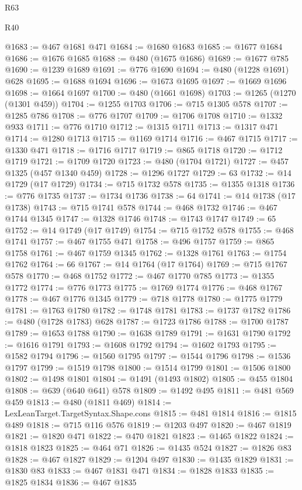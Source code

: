 \begin{lexlean}{R63}
\begin{lexlean}{R40}
\begin{coremodule}
{{{{{{{{{{{{{{{{{{{{{{{{{{{{{{{{{{{{{{{{{{{{{{{{{{{{{{{{{{{{{{{{{{{{{{{{{{{{{{{{{{{{{{{{{{{{{{{{{{{{{{{{{{{{{@1683 := @467 @1681 @471
@1684 := @1680 @1683
@1685 := @1677 @1684
@1686 := @1676 @1685
@1688 := @480 (@1675 @1686)
@1689 := @1677 @785
@1690 := @1239 @1689
@1691 := @776 @1690
@1694 := @480 (@1228 @1691) @628
@1695 := @1688 @1694
@1696 := @1673 @1695
@1697 := @1669 @1696
@1698 := @1664 @1697
@1700 := @480 (@1661 @1698)
@1703 := @1265 (@1270 (@1301 @459))
@1704 := @1255 @1703
@1706 := @715 @1305 @578
@1707 := @1285 @786
@1708 := @776 @1707
@1709 := @1706 @1708
@1710 := @1332 @933
@1711 := @776 @1710
@1712 := @1315 @1711
@1713 := @1317 @471
@1714 := @1280 @1713
@1715 := @1169 @1714
@1716 := @467 @1715
@1717 := @1330 @471
@1718 := @1716 @1717
@1719 := @865 @1718
@1720 := @1712 @1719
@1721 := @1709 @1720
@1723 := @480 (@1704 @1721)
@1727 := @457 @1325 (@457 @1340 @459)
@1728 := @1296 @1727
@1729 := 63
@1732 := @14 @1729 (@17 @1729)
@1734 := @715 @1732 @578
@1735 := @1355 @1318
@1736 := @776 @1735
@1737 := @1734 @1736
@1738 := 64
@1741 := @14 @1738 (@17 @1738)
@1743 := @715 @1741 @578
@1744 := @468 @1732
@1746 := @467 @1744 @1345
@1747 := @1328 @1746
@1748 := @1743 @1747
@1749 := 65
@1752 := @14 @1749 (@17 @1749)
@1754 := @715 @1752 @578
@1755 := @468 @1741
@1757 := @467 @1755 @471
@1758 := @496 @1757
@1759 := @865 @1758
@1761 := @467 @1759 @1345
@1762 := @1328 @1761
@1763 := @1754 @1762
@1764 := 66
@1767 := @14 @1764 (@17 @1764)
@1769 := @715 @1767 @578
@1770 := @468 @1752
@1772 := @467 @1770 @785
@1773 := @1355 @1772
@1774 := @776 @1773
@1775 := @1769 @1774
@1776 := @468 @1767
@1778 := @467 @1776 @1345
@1779 := @718 @1778
@1780 := @1775 @1779
@1781 := @1763 @1780
@1782 := @1748 @1781
@1783 := @1737 @1782
@1786 := @480 (@1728 @1783) @628
@1787 := @1723 @1786
@1788 := @1700 @1787
@1789 := @1653 @1788
@1790 := @1638 @1789
@1791 := @1631 @1790
@1792 := @1616 @1791
@1793 := @1608 @1792
@1794 := @1602 @1793
@1795 := @1582 @1794
@1796 := @1560 @1795
@1797 := @1544 @1796
@1798 := @1536 @1797
@1799 := @1519 @1798
@1800 := @1514 @1799
@1801 := @1506 @1800
@1802 := @1498 @1801
@1804 := @1491 (@1493 @1802)
@1805 := @455 @1804
@1808 := @639 (@640 @641) @578
@1809 := @1492 @495
@1811 := @481 @569 @459
@1813 := @480 (@1811 @469)
@1814 := LexLeanTarget.TargetSyntax.Shape.cons
@1815 := @481 @1814
@1816 := @1815 @489
@1818 := @715 @116 @576
@1819 := @1203 @497
@1820 := @467 @1819
@1821 := @1820 @471
@1822 := @470 @1821
@1823 := @1465 @1822
@1824 := @1818 @1823
@1825 := @464 @71
@1826 := @1435 @524
@1827 := @1826 @83
@1828 := @467 @1827
@1829 := @1204 @497
@1830 := @1435 @1829
@1831 := @1830 @83
@1833 := @467 @1831 @471
@1834 := @1828 @1833
@1835 := @1825 @1834
@1836 := @467 @1835
}}}}}}}}}}}}}}}}}}}}}}}}}}}}}}}}}}}}}}}}}}}}}}}}}}}}}}}}}}}}}}}}}}}}}}}}}}}}}}}}}}}}}}}}}}}}}}}}}}}}}}}}}}}}}
\end{coremodule}
\end{lexlean}
\end{lexlean}
